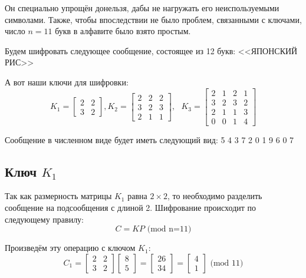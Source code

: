 \documentclass[a4paper,hidelinks,14pt]{extarticle}
\begin{document}
	Он специально упрощён донельзя, дабы не нагружать его неиспользуемыми символами. Также, чтобы впоследствии не было проблем, связанными с ключами, число $n=11$ букв в алфавите было взято простым.
	
	Будем шифровать следующее сообщение, состоящее из 12 букв: <<ЯПОНСКИЙ РИС>>
	\vspace{3mm}
	
	А вот наши ключи для шифровки:
	$$
	K_1 = \begin{bmatrix}
		2 & 2 \\
		3 & 2
	\end{bmatrix}, \text{}
	K_2 = \begin{bmatrix}
		2 & 2 & 2 \\
		3 & 2 & 3 \\
		2 & 1 & 1
	\end{bmatrix}, \text{ }
	K_3 = \begin{bmatrix}
		2 & 1 & 2 & 1\\
		3 & 2 & 3 & 2\\
		2 & 1 & 1 & 3\\
		0 & 0 & 1 & 4	
	\end{bmatrix}
	$$
	
	
	Сообщение в численном виде будет иметь следующий вид:  5 4 3 7 2 0 1 9 6 0 7
	
	\subsection{Ключ $K_1$}
	Так как размерность матрицы $K_1$ равна $2\times2$, то необходимо разделить сообщение на подсообщения с длиной 2. Шифрование происходит по следующему правилу:
	$$
	C = KP \text{ (mod n=11)}
	$$
	
	Произведём эту операцию с ключом $K_1$:
	$$
	C_1 = \begin{bmatrix}
		2 & 2 \\
		3 & 2
	\end{bmatrix}
	\begin{bmatrix}
		8\\
		5
	\end{bmatrix}
	=
	\begin{bmatrix}
		26 \\
		34
	\end{bmatrix}
	=
	\begin{bmatrix}
		4 \\
		1
	\end{bmatrix} \text{ (mod 11)}
	$$
	
\end{document}
